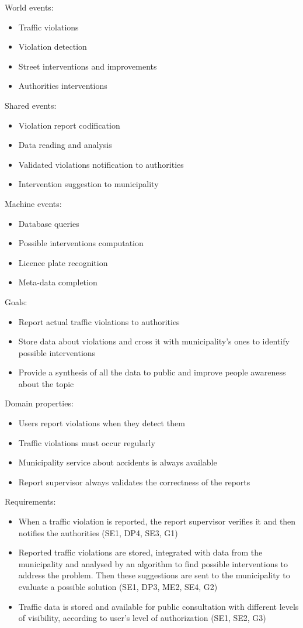 World events:
\begin{itemize}
    \item Traffic violations
    \item Violation detection
    \item Street interventions and improvements
    \item Authorities interventions
\end{itemize}

Shared events:
\begin{itemize}
    \item Violation report codification
    \item Data reading and analysis
    \item Validated violations notification to authorities
    \item Intervention suggestion to municipality
\end{itemize}

Machine events:
\begin{itemize}
    \item Database queries
    \item Possible interventions computation
    \item Licence plate recognition
    \item Meta-data completion
\end{itemize}

Goals:
\begin{itemize}
    \item Report actual traffic violations to authorities
    \item Store data about violations and cross it with municipality's ones to identify possible interventions
    \item Provide a synthesis of all the data to public and improve people awareness about the topic
\end{itemize}
Domain properties:
\begin{itemize}
    \item Users report violations when they detect them
    \item Traffic violations must occur regularly
    \item Municipality service about accidents is always available
    \item Report supervisor always validates the correctness of the reports
\end{itemize}
Requirements:
\begin{itemize}
    \item When a traffic violation is reported, the report supervisor verifies it and then notifies the authorities (SE1, DP4, SE3, G1)
    \item Reported traffic violations are stored, integrated with data from the municipality and analysed by an algorithm to find possible interventions to address the problem. Then these suggestions are sent to the municipality to evaluate a possible solution (SE1, DP3, ME2, SE4, G2)
    \item Traffic data is stored and available for public consultation with different levels of visibility, according to user's level of authorization (SE1, SE2, G3)
\end{itemize}